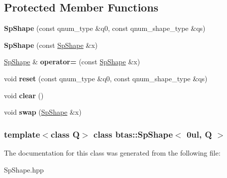 \subsection*{Protected Member Functions}
\begin{DoxyCompactItemize}
\item 
\hypertarget{classbtas_1_1_sp_shape_3_010ul_00_01_q_01_4_a63effe1ec49028017e6147e4ed3da7fd}{
{\bfseries SpShape} (const qnum\_\-type \&q0, const qnum\_\-shape\_\-type \&qs)}
\label{classbtas_1_1_sp_shape_3_010ul_00_01_q_01_4_a63effe1ec49028017e6147e4ed3da7fd}

\item 
\hypertarget{classbtas_1_1_sp_shape_3_010ul_00_01_q_01_4_a3409a270f413ddef697e90e634174e08}{
{\bfseries SpShape} (const \hyperlink{classbtas_1_1_sp_shape}{SpShape} \&x)}
\label{classbtas_1_1_sp_shape_3_010ul_00_01_q_01_4_a3409a270f413ddef697e90e634174e08}

\item 
\hypertarget{classbtas_1_1_sp_shape_3_010ul_00_01_q_01_4_a90dce82c704e5fe68a6d8dd178354e2a}{
\hyperlink{classbtas_1_1_sp_shape}{SpShape} \& {\bfseries operator=} (const \hyperlink{classbtas_1_1_sp_shape}{SpShape} \&x)}
\label{classbtas_1_1_sp_shape_3_010ul_00_01_q_01_4_a90dce82c704e5fe68a6d8dd178354e2a}

\item 
\hypertarget{classbtas_1_1_sp_shape_3_010ul_00_01_q_01_4_aead0d9c2e37d9c4dc53ded85de5ffb5c}{
void {\bfseries reset} (const qnum\_\-type \&q0, const qnum\_\-shape\_\-type \&qs)}
\label{classbtas_1_1_sp_shape_3_010ul_00_01_q_01_4_aead0d9c2e37d9c4dc53ded85de5ffb5c}

\item 
\hypertarget{classbtas_1_1_sp_shape_3_010ul_00_01_q_01_4_a2c91486ed4c09178bef7c0769aa09178}{
void {\bfseries clear} ()}
\label{classbtas_1_1_sp_shape_3_010ul_00_01_q_01_4_a2c91486ed4c09178bef7c0769aa09178}

\item 
\hypertarget{classbtas_1_1_sp_shape_3_010ul_00_01_q_01_4_aa013dc768c7fee4fac912d9d42b78665}{
void {\bfseries swap} (\hyperlink{classbtas_1_1_sp_shape}{SpShape} \&x)}
\label{classbtas_1_1_sp_shape_3_010ul_00_01_q_01_4_aa013dc768c7fee4fac912d9d42b78665}

\end{DoxyCompactItemize}
\subsubsection*{template$<$class Q$>$ class btas::SpShape$<$ 0ul, Q $>$}



The documentation for this class was generated from the following file:\begin{DoxyCompactItemize}
\item 
SpShape.hpp\end{DoxyCompactItemize}
